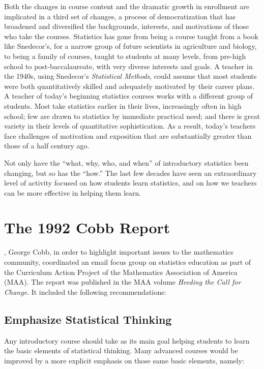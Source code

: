 \documentclass[twoside,openany]{tufte-book}
\begin{document}
Both the changes in course content and the dramatic growth in enrollment are implicated in a third set of changes, a process of democratization that has broadened and diversified the backgrounds, interests, and motivations of those who take the courses.  Statistics has gone from being a course taught from a book like Snedecor's, for a narrow group of future scientists in agriculture and biology, to being a family of courses, taught to students at many levels, from pre-high school to post-baccalaureate, with very diverse interests and goals. A teacher in the 1940s, using Snedecor's \textit{Statistical Methods}, could assume that most students were both quantitatively skilled and adequately motivated by their career plans. A teacher of today's beginning statistics courses works with a different group of students.  Most take statistics earlier in their lives, increasingly often in high school; few are drawn to statistics by immediate practical need; and there is great variety in their levels of quantitative sophistication.  As a result, today's teachers face challenges of motivation and exposition that are substantially greater than those of a half century ago.

Not only have the ``what, why, who, and when'' of introductory statistics been changing, but so has the ``how.''  The last few decades have seen an extraordinary level of activity focused on how students learn statistics, and on how we teachers can be more effective in helping them learn. 


\section{\textbf{The 1992 Cobb Report}}
, George Cobb, in order to highlight important issues to the mathematics community, coordinated an email focus group on statistics education as part of the Curriculum Action Project of the Mathematics Association of America (MAA). The report was published in the MAA volume \textit{Heeding the Call for Change}\cite{cobb1}. It included the following recommendations:

\subsection{\textbf{Emphasize Statistical Thinking}}
Any introductory course should take as its main goal helping students to learn the basic elements of statistical thinking. Many advanced courses would be improved by a more explicit emphasis on those same basic elements, namely:
\end{document}
